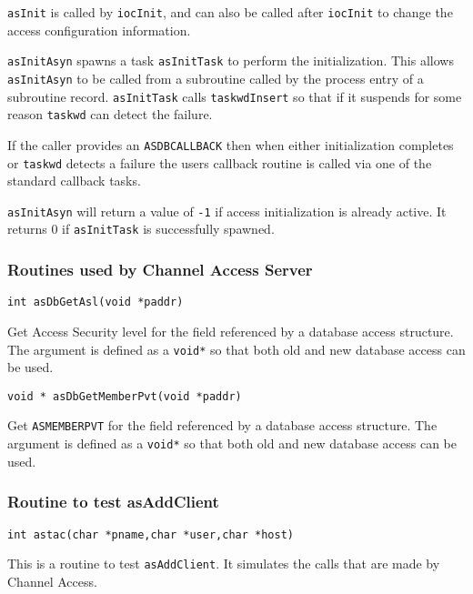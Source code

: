 \verb|asInit| is called by \verb|iocInit|, and can also be called after \verb|iocInit| to change the access configuration information.

\verb|asInitAsyn| spawns a task \verb|asInitTask| to perform the initialization. This allows \verb|asInitAsyn| to be called from a 
subroutine called by the process entry of a subroutine record. \verb|asInitTask| calls \verb|taskwdInsert| so that if it suspends 
for some reason \verb|taskwd| can detect the failure.

If the caller provides an \verb|ASDBCALLBACK| then when either initialization completes or \verb|taskwd| detects a failure the users 
callback routine is called via one of the standard callback tasks.

\verb|asInitAsyn| will return a value of \verb|-1| if access initialization is already active. It returns 0 if \verb|asInitTask| is 
successfully spawned.

\subsubsection{Routines used by Channel Access Server}

\begin{verbatim}
int asDbGetAsl(void *paddr)
\end{verbatim}

Get Access Security level for the field referenced by a database access structure. The argument is defined as a \verb|void*| so 
that both old and new database access can be used.



\begin{verbatim}
void * asDbGetMemberPvt(void *paddr)
\end{verbatim}

Get \verb|ASMEMBERPVT| for the field referenced by a database access structure. The argument is defined as a \verb|void*| so that 
both old and new database access can be used.

\subsubsection{Routine to test asAddClient}

\begin{verbatim}
int astac(char *pname,char *user,char *host)
\end{verbatim}

This is a routine to test \verb|asAddClient|. It simulates the calls that are made by Channel Access.

